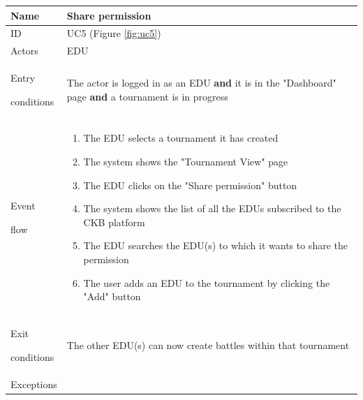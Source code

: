 \begin{center}
    \def\arraystretch{1.5}
    \begin{tabular}{| m{2cm} | m{10cm}|}
        \hline
        Name                  & Share permission                                                                                                        \\ \hline
        ID                    & UC5 (Figure \ref{fig:uc5})                                                                                              \\ \hline
        Actors                & EDU                                                                                                                     \\ \hline
        Entry \par conditions & The actor is logged in as an EDU \textbf{and} it is in the "Dashboard" page \textbf{and} a tournament is in progress    \\ \hline
        Event \par flow       & \begin{enumerate}
                                    \item The EDU selects a tournament it has created
                                    \item The system shows the "Tournament View" page
                                    \item The EDU clicks on the "Share permission" button
                                    \item The system shows the list of all the EDUs subscribed to the CKB platform
                                    \item The EDU searches the EDU(s) to which it wants to share the permission
                                    \item The user adds an EDU to the tournament by clicking the "Add" button
                                \end{enumerate}                                                                                                         \\ \hline
        Exit \par conditions  & The other EDU(s) can now create battles within that tournament                                                          \\ \hline
        Exceptions            & \begin{itemize}

\end{itemize}
\end{tabular}
\end{center}
